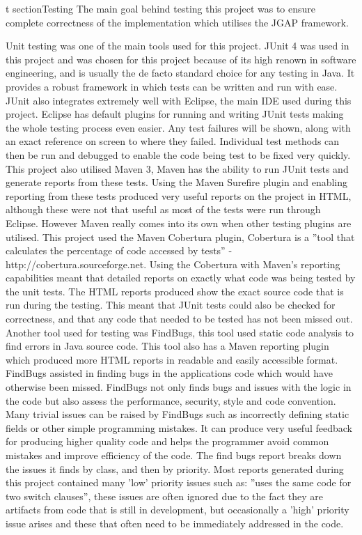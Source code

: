 \documentclass[12pt]{article}
\begin{document}
t
section{Testing}
The main goal behind testing this project was to ensure complete correctness of the implementation which utilises the JGAP framework.

Unit testing was one of the main tools used for this project. JUnit 4 was used in this project and was chosen for this project because
of its high renown in software engineering, and is usually the de facto standard choice for any testing in Java. It provides a robust framework
in which tests can be written and run with ease. JUnit also integrates extremely well with Eclipse, the main IDE used during this project. Eclipse has default plugins for running and writing JUnit tests making the whole testing process even easier. Any test
failures will be shown, along with an exact reference on screen to where they failed. Individual test methods can then be run and
debugged to enable the code being test to be fixed very quickly.
This project also utilised Maven 3, Maven has the ability to run JUnit tests and generate reports from these tests. Using the Maven
Surefire plugin and enabling reporting from these tests produced very useful reports on the project in HTML, although these were not
that useful as most of the tests were run through Eclipse. However Maven really comes into its own when other testing plugins are
utilised. This project used the Maven Cobertura plugin, Cobertura is a ''tool that calculates the percentage of code accessed by 
tests'' - http://cobertura.sourceforge.net. Using the Cobertura with Maven's reporting capabilities meant that detailed reports
on exactly what code was being tested by the unit tests. The HTML reports produced show the exact source code that is run during the
testing. This meant that JUnit tests could also be checked for correctness, and that any code that needed to be tested has not been
missed out.
Another tool used for testing was FindBugs, this tool used static code analysis to find errors in Java source code. This tool also
has a Maven reporting plugin which produced more HTML reports in readable and easily accessible format. FindBugs assisted in finding bugs in the 
applications code which would have otherwise been missed. FindBugs not only finds bugs and issues with the logic in the code
but also assess the performance, security, style and code convention. Many trivial issues can be raised by FindBugs such as 
incorrectly defining static fields or other simple programming mistakes. It can produce very useful feedback for producing
higher quality code and helps the programmer avoid common mistakes and improve efficiency of the code. The find bugs report breaks
down the issues it finds by class, and then by priority. Most reports generated during this project contained many 'low' priority
issues such as: ''uses the same code for two switch clauses'', these issues are often ignored due to the fact they are artifacts
from code that is still in development, but occasionally a 'high' priority issue arises and these that often need to be immediately
addressed in the code. 
\end{document}
